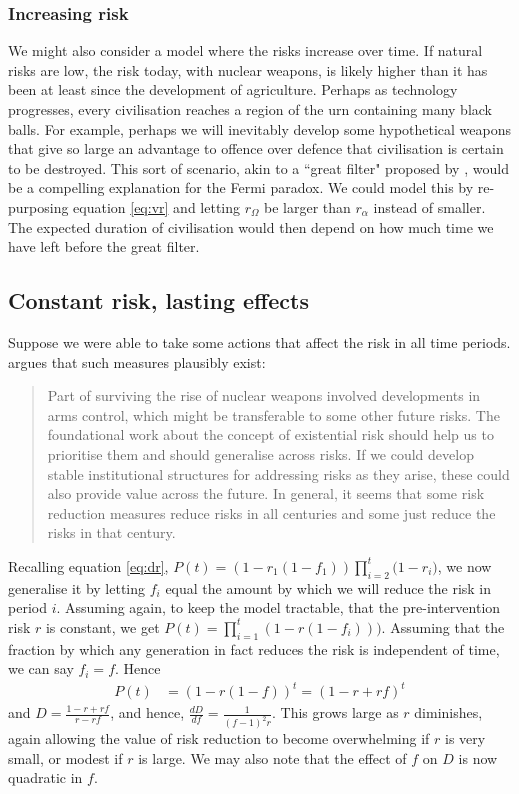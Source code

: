 \documentclass[british]{article}
\begin{document}
\subsubsection{Increasing risk} We might also consider a model where the risks increase over time. If natural risks are low, the risk today, with nuclear weapons, is likely higher than it has been at least since the development of agriculture. Perhaps as technology progresses, every civilisation reaches a region of the urn containing many black balls. For example, perhaps we will inevitably develop some hypothetical weapons that give so large an advantage to offence over defence that civilisation is certain to be destroyed. This sort of scenario, akin to a ``great filter" proposed by \cite{hanson_great_1998}, would be a compelling explanation for the Fermi paradox. We could model this by re-purposing equation \ref{eq:vr} and letting $r_\Omega$ be larger than $r_\alpha$ instead of smaller. The expected duration of civilisation would then depend on how much time we have left before the great filter.

\subsection{Constant risk, lasting effects}\label{cr-le}
Suppose we were able to take some actions that affect the risk in all time periods. \cite{ord_modelling_2014} argues that such measures plausibly exist:

\begin{quote}
Part of surviving the rise of nuclear weapons involved developments in arms control, which might be transferable to some other future risks. The foundational work about the concept of existential risk should help us to prioritise them and should generalise across risks. If we could develop stable institutional structures for addressing risks as they arise, these could also provide value across the future. In general, it seems that some risk reduction measures reduce risks in all centuries and some just reduce the risks in that century.
\end{quote}

Recalling equation \ref{eq:dr}, $P(t) =  (1-r_1(1-f_1)) \prod_{i=2}^t {(1-r_i})$, we now generalise it by letting $f_i$ equal the amount by which we will reduce the risk in period $i$. Assuming again, to keep the model tractable, that the pre-intervention risk $r$ is constant, we get $P(t) = \prod_{i=1}^t {(1-r(1-f_i))})$. Assuming that the fraction by which any generation in fact reduces the risk is independent of time, we can say $f_i = f$. Hence
\begin{align*}
P(t) &= (1-r(1-f))^t = (1-r+rf)^t
\end{align*}
and $D= \frac{1-r+rf}{r-rf}$, and hence, $\frac{dD}{df}=\frac{1}{(f-1)^2r}$. This grows large as \(r\) diminishes, again allowing the value of risk reduction to become overwhelming if $r$ is very small, or modest if $r$ is large. We may also note that the effect of $f$ on $D$ is now quadratic in $f$.
\end{document}
